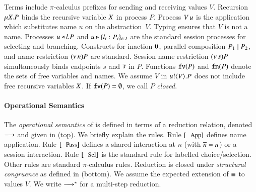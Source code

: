 \documentclass[runningheads]{llncs}
\begin{document}

Terms
include $\pi$-calculus prefixes for sending and receiving values $V$.
Recursion   $\mu X. P$ binds the recursive variable $X$ in process $P$.
Process 
$V\, {u}$ 
is the application
which substitutes name $u$ on the abstraction~$V$. 
Typing  ensures that $V$ is not a name.
Processes $u \triangleleft l . P$ and $u \triangleright \{l_i: P_i\}_{i \in I}$ are the
standard session processes for selecting and branching.
Constructs for 
inaction $\mathbf{0}$,  parallel composition $P_1 \;|\; P_2$, and 
name restriction $(\nu\, n) P$ are standard.
Session name restriction $(\nu\, s) P$ simultaneously binds endpoints $s$ and $\overline{s}$ in $P$.
Functions $\mathtt{fv}(P)$ and $\mathtt{fn}(P)$ denote the sets of free 
variables and names.
We assume $V$ in $u ! \langle V \rangle .{P}$ does not include free recursive 
variables $X$.
If $\mathtt{fv}(P) = \emptyset$, we call $P$ {\em closed}.






\paragraph{Operational Semantics}
The \emph{operational semantics} of \HOp is defined in terms of a reduction relation, 
denoted $\longrightarrow$ and 
given in 
  (top).
 We briefly explain the rules. 
Rule $\orule{App}$ defines  name application.
Rule $\orule{Pass}$ defines a shared interaction at $n$ 
(with $\overline{n}=n$) or a session interaction.
Rule $\orule{Sel}$ is the standard rule for labelled choice/selection.%
Other rules are standard $\pi$-calculus rules.
Reduction is closed under \emph{structural congruence} as defined in  (bottom). 
We assume the expected extension of $\equiv$ to values $V$.
We write $\longrightarrow^\ast$ for a multi-step reduction.
\end{document}
